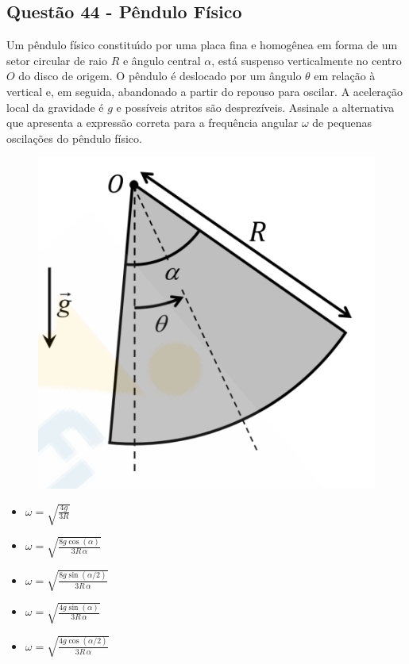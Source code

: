 \documentclass[a4paper,12pt]{article}
\begin{document}
\begin{flushleft}

\subsection{Quest\~ao 44 - P\^endulo F\'isico}
Um p\^endulo f\'isico constitu\'{\i}do por uma placa fina e homog\^enea em forma de um setor circular de raio $R$ e \^angulo 
central $\alpha$, est\'a suspenso verticalmente no centro $O$ do disco de origem. O p\^endulo \'{e} deslocado por um \^angulo 
$\theta$ em rela\c{c}\~ao \`a vertical e, em seguida, abandonado a partir do repouso para oscilar. A acelera\c{c}\~ao local 
da gravidade \'e $g$ e poss\'iveis atritos s\~ao desprez\'iveis. Assinale a alternativa que apresenta a express\~ao correta 
para a frequ\^encia angular $\omega$ de pequenas oscila\c{c}\~oes do p\^endulo f\'isico.

\begin{figure}[!h]
  \centering
  \includegraphics[scale=0.5]{figures/pendulo_fisico.png}
\end{figure}


\begin{itemize}
\item[(A)] $\displaystyle \omega=\sqrt{\frac{4g}{3R}}$
\item[(B)] $\displaystyle \omega=\sqrt{\frac{8g\cos(\alpha)}{3R\,\alpha}}$
\item[(C)] $\displaystyle \omega=\sqrt{\frac{8g\sin(\alpha/2)}{3R\,\alpha}}$
\item[(D)] $\displaystyle \omega=\sqrt{\frac{4g\sin(\alpha)}{3R\,\alpha}}$
\item[(E)] $\displaystyle \omega=\sqrt{\frac{4g\cos(\alpha/2)}{3R\,\alpha}}$
\end{itemize}


\end{flushleft}
\end{document}

